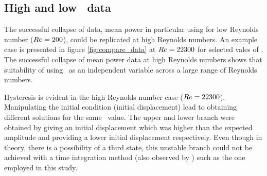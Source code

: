 \subsection{High and low \reynoldsnumber \ data}



The successful collapse of data, mean power in particular using \massdamp for low Reynolds number ($Re=200$), could be replicated at high Reynolds numbers. An example case is presented in figure \ref{fig:compare_data} at $Re=22300$ for selected vales of \massstiff. The successful collapse of mean power data at high Reynolds numbers shows that suitability of using \massdamp \ as an independent variable across a large range of Reynolds numbers. 

Hysteresis is evident in the high Reynolds number case ($Re=22300$). Manipulating the initial condition (initial displacement) lead to obtaining different solutions for the same \massdamp \ value. The upper and lower branch were obtained by giving an initial displacement which was higher than the expected amplitude and providing a lower initial displacement respectively. Even though in theory, there is a possibility of a third state, this unstable branch could not be achieved with a time integration method (also observed by \citep{Vio2007}) such as the one employed in this study.    













    


